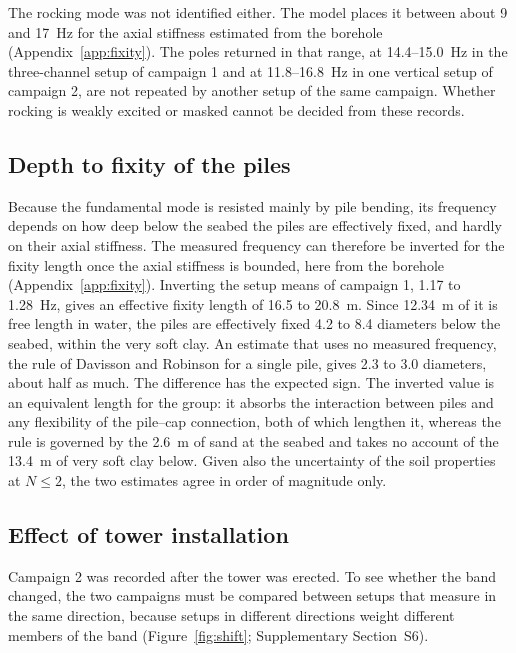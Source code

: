 \documentclass[11pt]{article}
\begin{document}
The rocking mode was not identified either. The model places it between about 9 and 17~Hz for the axial stiffness estimated from the borehole (Appendix~\ref{app:fixity}). The poles returned in that range, at 14.4--15.0~Hz in the three-channel setup of campaign 1 and at 11.8--16.8~Hz in one vertical setup of campaign 2, are not repeated by another setup of the same campaign. Whether rocking is weakly excited or masked cannot be decided from these records.

\subsection{Depth to fixity of the piles}
\label{sec:stiffness}

Because the fundamental mode is resisted mainly by pile bending, its frequency depends on how deep below the seabed the piles are effectively fixed, and hardly on their axial stiffness. The measured frequency can therefore be inverted for the fixity length once the axial stiffness is bounded, here from the borehole (Appendix~\ref{app:fixity}). Inverting the setup means of campaign 1, 1.17 to 1.28~Hz, gives an effective fixity length of 16.5 to 20.8~m. Since 12.34~m of it is free length in water, the piles are effectively fixed 4.2 to 8.4 diameters below the seabed, within the very soft clay. An estimate that uses no measured frequency, the rule of Davisson and Robinson \cite{davisson1965} for a single pile, gives 2.3 to 3.0 diameters, about half as much. The difference has the expected sign. The inverted value is an equivalent length for the group: it absorbs the interaction between piles and any flexibility of the pile--cap connection, both of which lengthen it, whereas the rule is governed by the 2.6~m of sand at the seabed and takes no account of the 13.4~m of very soft clay below. Given also the uncertainty of the soil properties at $N \leq 2$, the two estimates agree in order of magnitude only.

\subsection{Effect of tower installation}
\label{sec:tower}

Campaign 2 was recorded after the tower was erected. To see whether the band changed, the two campaigns must be compared between setups that measure in the same direction, because setups in different directions weight different members of the band (Figure~\ref{fig:shift}; Supplementary Section~S6).
\end{document}
